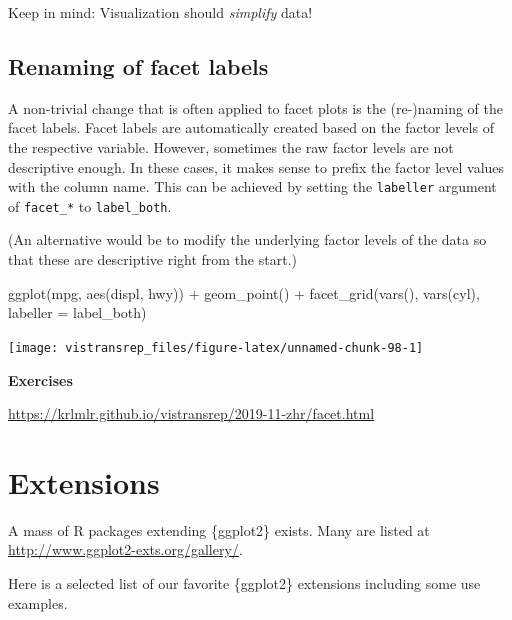 \documentclass[]{book}
\newenvironment{Shaded}{}{}
\newcommand{\DataTypeTok}[1]{#1}
\newcommand{\KeywordTok}[1]{\textcolor[rgb]{0.00,0.00,1.00}{#1}}
\newcommand{\NormalTok}[1]{#1}
\newcommand{\OperatorTok}[1]{#1}
\newcommand{\StringTok}[1]{\textcolor[rgb]{0.00,0.50,0.50}{#1}}
\begin{document}
Keep in mind: Visualization should \emph{simplify} data!

\hypertarget{renaming-of-facet-labels}{%
\subsection{Renaming of facet labels}\label{renaming-of-facet-labels}}

A non-trivial change that is often applied to facet plots is the (re-)naming of the facet labels.
Facet labels are automatically created based on the factor levels of the respective variable.
However, sometimes the raw factor levels are not descriptive enough.
In these cases, it makes sense to prefix the factor level values with the column name.
This can be achieved by setting the \texttt{labeller} argument of \texttt{facet\_*} to \texttt{label\_both}.

(An alternative would be to modify the underlying factor levels of the data so that these are descriptive right from the start.)

\begin{Shaded}
\begin{Highlighting}[]
\KeywordTok{ggplot}\NormalTok{(mpg, }\KeywordTok{aes}\NormalTok{(displ, hwy)) }\OperatorTok{+}
\StringTok{  }\KeywordTok{geom_point}\NormalTok{() }\OperatorTok{+}
\StringTok{  }\KeywordTok{facet_grid}\NormalTok{(}\KeywordTok{vars}\NormalTok{(), }\KeywordTok{vars}\NormalTok{(cyl), }\DataTypeTok{labeller =}\NormalTok{ label_both)}
\end{Highlighting}
\end{Shaded}

\begin{flushright}\texttt{[image: vistransrep\_files/figure-latex/unnamed-chunk-98-1]} \end{flushright}

\textbf{Exercises}

\url{https://krlmlr.github.io/vistransrep/2019-11-zhr/facet.html}

\hypertarget{extensions}{%
\section{Extensions}\label{extensions}}

A mass of R packages extending \{ggplot2\} exists.
Many are listed at \url{http://www.ggplot2-exts.org/gallery/}.

Here is a selected list of our favorite \{ggplot2\} extensions including some use examples.
\end{document}
